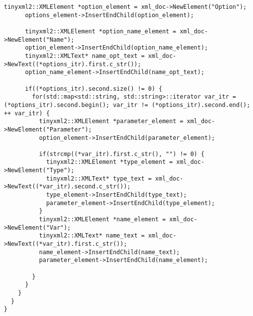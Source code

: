 \documentclass[a4paper,10pt,twoside]{book}
\begin{document}
\begin{lstlisting}[language=CCC, caption=pragma\_handler/Node.cpp]
      tinyxml2::XMLElement *option_element = xml_doc->NewElement("Option");
      options_element->InsertEndChild(option_element);

      tinyxml2::XMLElement *option_name_element = xml_doc->NewElement("Name");
      option_element->InsertEndChild(option_name_element);
      tinyxml2::XMLText* name_opt_text = xml_doc->NewText((*options_itr).first.c_str());
      option_name_element->InsertEndChild(name_opt_text);

      if((*options_itr).second.size() != 0) {
        for(std::map<std::string, std::string>::iterator var_itr = (*options_itr).second.begin(); var_itr != (*options_itr).second.end(); ++ var_itr) {
          tinyxml2::XMLElement *parameter_element = xml_doc->NewElement("Parameter");
          option_element->InsertEndChild(parameter_element);

          if(strcmp((*var_itr).first.c_str(), "") != 0) {
            tinyxml2::XMLElement *type_element = xml_doc->NewElement("Type");
            tinyxml2::XMLText* type_text = xml_doc->NewText((*var_itr).second.c_str());
            type_element->InsertEndChild(type_text);
            parameter_element->InsertEndChild(type_element);
          }
          tinyxml2::XMLElement *name_element = xml_doc->NewElement("Var");
          tinyxml2::XMLText* name_text = xml_doc->NewText((*var_itr).first.c_str());
          name_element->InsertEndChild(name_text);
          parameter_element->InsertEndChild(name_element);

        }
      }
    }
  }
}
\end{lstlisting}
\end{document}
